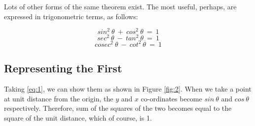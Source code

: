 Lots of other forms of the same theorem exist. The most useful, perhaps, are
expressed in trigonometric terms, as follows:

\begin{equation}\label{eq:1}
    sin^2~\theta ~+~ cos^2~\theta ~=~ 1
\end{equation}
\begin{equation}\label{eg:2}
    sec^2~\theta ~-~ tan^2~\theta ~=~ 1
\end{equation}
\begin{equation}\label{eq:3}
    cosec^2~\theta ~-~ cot^2~\theta ~=~ 1
\end{equation}

\subsection{Representing the First}
Taking \ref{eq:1}, we can show them as shown in Figure \ref{fig:2}. When we take a point at
unit distance from the origin, the $y$ and $x$ co-ordinates become $sin~\theta$ and $cos~\theta$
respectively. Therefore, sum of the squares of the two becomes equal to the
square of the unit distance, which of course, is 1.
